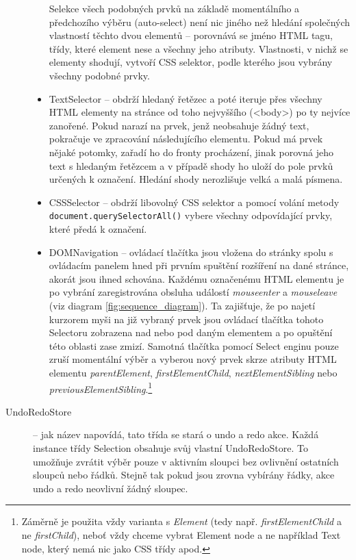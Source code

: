 \documentclass[thesis=B,czech]{FITthesis}[2012/06/26]
\begin{document}
\begin{description}
\begin{itemize}
		Selekce všech podobných prvků na základě momentálního a předchozího výběru (auto-select) není nic jiného než hledání společných vlastností těchto dvou elementů -- porovnává se jméno HTML tagu, třídy, které element nese a všechny jeho atributy. Vlastnosti, v nichž se elementy shodují, vytvoří CSS selektor, podle kterého jsou vybrány všechny podobné prvky.
		\item TextSelector -- obdrží hledaný řetězec a poté iteruje přes všechny HTML elementy na stránce od toho nejvyššího (\textsf{\textless body\textgreater}) po ty nejvíce zanořené. Pokud narazí na prvek, jenž neobsahuje žádný text, pokračuje ve zpracování následujícího elementu. Pokud má prvek nějaké potomky, zařadí ho do fronty procházení, jinak porovná jeho text s hledaným řetězcem a v případě shody ho uloží do pole prvků určených k označení. Hledání shody nerozlišuje velká a malá písmena.
		\item CSSSelector -- obdrží libovolný CSS selektor a pomocí volání metody \verb|document.querySelectorAll()| vybere všechny odpovídající prvky, které předá k označení.
		\item DOMNavigation -- ovládací tlačítka jsou vložena do stránky spolu s ovládacím panelem hned při prvním spuštění rozšíření na dané stránce, akorát jsou ihned schována. Každému označenému HTML elementu je po vybrání zaregistrována obsluha událostí \emph{mouseenter} a \emph{mouseleave} (viz diagram \ref{fig:sequence_diagram}). Ta zajišťuje, že po najetí kurzorem myši na již vybraný prvek jsou ovládací tlačítka tohoto Selectoru zobrazena nad nebo pod daným elementem a po opuštění této oblasti zase zmizí. Samotná tlačítka pomocí Select enginu pouze zruší momentální výběr a vyberou nový prvek skrze atributy HTML elementu \emph{parentElement}, \emph{firstElementChild}, \emph{nextElementSibling} nebo \emph{previousElementSibling}.\footnote{Záměrně je použita vždy varianta s \emph{Element} (tedy např. \emph{firstElementChild} a ne \emph{firstChild}), neboť vždy chceme vybrat Element node a ne například Text node, který nemá nic jako CSS třídy apod.}
	\end{itemize}

	\item[UndoRedoStore] -- jak název napovídá, tato třída se stará o undo a redo akce. Každá instance třídy Selection obsahuje svůj vlastní UndoRedoStore. To umožňuje zvrátit výběr pouze v aktivním sloupci bez ovlivnění ostatních sloupců nebo řádků. Stejně tak pokud jsou zrovna vybírány řádky, akce undo a redo neovlivní žádný sloupec.
	

\end{description}
\end{document}

